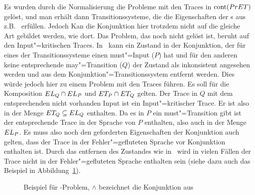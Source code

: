 Es wurden durch die Normalisierung die Probleme mit den Traces in $\mathrm{cont}
(PrET)$ gelöst, und man erhält dann Transitionssysteme, die die Eigenschaften
der \MIA{}s aus z.B.~\cite{Vogler2016MIA3} erfüllen. Jedoch Kan die Konjunktion
hier trotzdem nicht auf die gleiche Art gebildet werden, wie dort. Das Problem,
das noch nicht gelöst ist, beruht auf den Input"=kritischen Traces.
In~\cite{Vogler2016MIA3} kann ein Zustand in der Konjunktion, der für eines der
Transitionssysteme einen must"=Input ($P$) hat und für den anderen keine
entsprechende may"=Transition ($Q$) der Zustand als inkonsistent angesehen
werden und aus dem Konjunktion"=Transitionssystem entfernt werden. Dies würde
jedoch hier zu einem Problem mit den Traces führen. Es soll für die Komposition
$EL _Q \cap EL _P$ und $ET _P \cap ET _Q$ gelten. Der Trace in $Q$ mit
dem entsprechenden nicht vorhanden Input ist ein Input"=kritischer Trace. Er
ist also in der Menge $ET _Q\subseteq EL _Q$ enthalten. Da es in $P$ ein
must"=Transition gibt ist der entsprechende Trace in der Sprache von $P$
enthalten, also auch in der Menge $EL _P$. Es muss also noch den geforderten
Eigenschaften der Konjunktion auch gelten, dass der Trace in der
Fehler"=gefluteten Sprache vor Konjunktion enthalten ist. Durch das entfernen
des Zustandes wie in~\cite{Vogler2016MIA3} wird in vielen Fällen der Trace
nicht in der Fehler"=gefluteten Sprache enthalten sein (siehe dazu auch das
Beispiel in Abbildung~\ref{BspMITConj}).

\begin{figure}[htbp]
  \begin{center}
    \caption{Beispiel für \MIT{}-Problem, $\land$ bezeichnet die Konjunktion
    aus~\cite{Vogler2016MIA3}}
    \label{BspMITConj}
  \end{center}
\end{figure}

